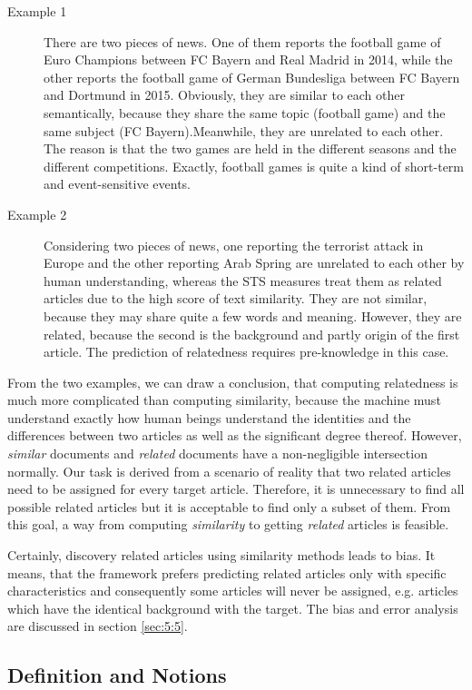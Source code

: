 \begin{description}
\item[Example 1] There are two pieces of news. One of them reports the football game of Euro Champions between FC Bayern and Real Madrid in 2014, while the other reports the football game of German Bundesliga between FC Bayern and Dortmund in 2015. Obviously, they are similar to each other semantically, because they share the same topic (football game) and the same subject (FC Bayern).Meanwhile, they are unrelated to each other. The reason is that the two games are held in the different seasons and the different competitions. Exactly, football games is quite a kind of short-term and event-sensitive events. 
\item[Example 2] Considering two pieces of news, one reporting the terrorist attack in Europe and the other reporting Arab Spring are unrelated to each other by human understanding, whereas the STS measures treat them as related articles due to the high score of text similarity. They are not similar, because they may share quite a few words and meaning. However, they are related, because the second is the background and partly origin of the first article. The prediction of relatedness requires pre-knowledge in this case.
\end{description}

From the two examples, we can draw a conclusion, that computing relatedness is much more complicated than computing similarity, because the machine must understand exactly how human beings understand the identities and the differences between two articles as well as the significant degree thereof. However, \textit{similar} documents and \textit{related} documents have a non-negligible intersection normally. Our task is derived from a scenario of reality that two related articles need to be assigned for every target article. Therefore, it is unnecessary to find all possible related articles but it is acceptable to find only a subset of them. From this goal, a way from computing \textit{similarity} to getting \textit{related} articles is feasible. 

Certainly, discovery related articles using similarity methods leads to bias. It means, that the framework prefers predicting related articles only with specific characteristics and consequently some articles will never be assigned, e.g. articles which have the identical background with the target. The bias and error analysis are discussed in section \ref{sec:5:5}.

\subsection{Definition and Notions}
\label{sec:4.2}


